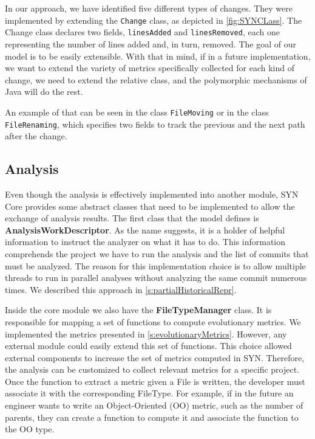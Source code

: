 In our approach, we have identified five different types of changes. They were implemented by extending the \texttt{Change} class, as depicted in \autoref{fig:SYNCLass}. The Change class declares two fields, \texttt{linesAdded} and \texttt{linesRemoved}, each one representing the number of lines added and, in turn, removed. 
The goal of our model is to be easily extensible. With that in mind, if in a future implementation, we want to extend the variety of metrics specifically collected for each kind of change, we need to extend the relative class, and the polymorphic mechanisms of Java will do the rest. 

An example of that can be seen in the class \texttt{FileMoving} or in the class \texttt{FileRenaming}, which specifies two fields to track the previous and the next path after the change. 




\subsection*{Analysis}
Even though the analysis is effectively implemented into another module, SYN Core provides some abstract classes that need to be implemented to allow the exchange of analysis results. 
The first class that the model defines is \textbf{AnalysisWorkDescriptor}.
As the name suggests, it is a holder of helpful information to instruct the analyzer on what it has to do. This information comprehends the project we have to run the analysis and the list of commits that must be analyzed. 
The reason for this implementation choice is to allow multiple threads to run in parallel analyses without analyzing the same commit numerous times. 
We described this approach in \autoref{s:partialHistoricalRepr}.
\bigbreak

Inside the core module we also have the \textbf{FileTypeManager} class. It is responsible for mapping a set of functions to compute evolutionary metrics. We implemented the metrics presented in \autoref{s:evolutionaryMetrics}. However, any external module could easily extend this set of functions. This choice allowed external components to increase the set of metrics computed in SYN. Therefore, the analysis can be customized to collect relevant metrics for a specific project. Once the function to extract a metric given a File is written, the developer must associate it with the corresponding FileType. For example, if in the future an engineer wants to write an  Object-Oriented (OO) metric, such as the number of parents, they can create a function to compute it and associate the function to the OO type.
\bigbreak

